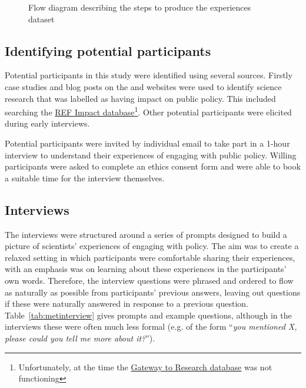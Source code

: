 \begin{figure}
    \centering
    \caption{Flow diagram describing the steps to produce the experiences dataset}
    \label{fig:metflowchart}
\end{figure}

\subsection{Identifying potential participants}\label{sec:metidentify}

Potential participants in this study were identified using several sources. Firstly case studies and blog posts on the \REF{} and \UKRI{} websites were used to identify \CAN{} science research that was labelled as having impact on public policy. This included searching the \href{https://results2021.ref.ac.uk/impact}{REF Impact database}\footnote{Unfortunately, at the time the \UKRI{} \href{https://gtr.gtr.ukri.org/}{Gateway to Research database} was not functioning}. Other potential participants were elicited during early interviews.

Potential participants were invited by individual email to take part in a 1-hour interview to understand their experiences of engaging with public policy. Willing participants were asked to complete an ethics consent form and were able to book a suitable time for the interview themselves.

\subsection{Interviews}\label{sec:metinterview}

The interviews were structured around a series of prompts designed to build a picture of scientists' experiences of engaging with policy. The aim was to create a relaxed setting in which participants were comfortable sharing their experiences, with an emphasis was on learning about these experiences in the participants' own words. Therefore, the interview questions were phrased and ordered to flow as naturally as possible from participants' previous answers, leaving out questions if these were naturally answered in response to a previous question. Table~\ref{tab:metinterview} gives prompts and example questions, although in the interviews these were often much less formal (e.g. of the form ``\textit{you mentioned X, please could you tell me more about it?}'').

